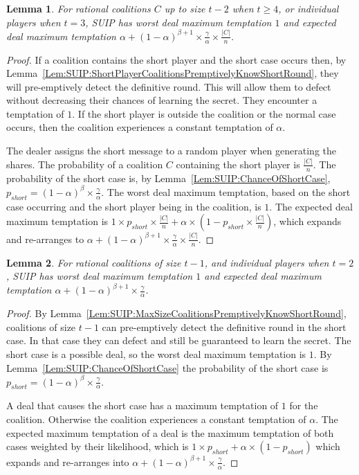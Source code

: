 \documentclass[12pt]{dalcsthesis}
\newtheorem{lemma}{Lemma}
\begin{document}
\begin{lemma}\label{Lem:SUIP:AllCoalitionsTempted}For rational coalitions $C$ up to size $t-2$ when $t \geq 4$, or individual players when $t=3$, SUIP has worst deal maximum temptation $1$ and expected deal maximum temptation $\alpha + (1-\alpha)^{\beta+1} \times \frac{\gamma}{\alpha} \times \frac{|C|}{n}$.\end{lemma}
\begin{proof}
If a coalition contains the short player and the short case occurs then, by Lemma~\ref{Lem:SUIP:ShortPlayerCoalitionsPremptivelyKnowShortRound}, they will pre-emptively detect the definitive round. This will allow them to defect without decreasing their chances of learning the secret. They encounter a temptation of $1$. If the short player is outside the coalition or the normal case occurs, then the coalition experiences a constant temptation of $\alpha$.

The dealer assigns the short message to a random player when generating the shares. The probability of a coalition $C$ containing the short player is $\frac{|C|}{n}$. The probability of the short case is, by Lemma~\ref{Lem:SUIP:ChanceOfShortCase}, $p_{short} = (1-\alpha)^\beta \times \frac{\gamma}{\alpha}$. The worst deal maximum temptation, based on the short case occurring and the short player being in the coalition, is $1$. The expected deal maximum temptation is $1 \times p_{short} \times \frac{|C|}{n} + \alpha \times (1 - p_{short} \times \frac{|C|}{n})$, which expands and re-arranges to $\alpha + (1-\alpha)^{\beta+1} \times \frac{\gamma}{\alpha} \times \frac{|C|}{n}$.
\end{proof}

\begin{lemma}\label{Lem:SUIP:MaxSizeCoalitionsTemptedMore}For rational coalitions of size $t-1$, and individual players when $t=2$, SUIP has worst deal maximum temptation $1$ and expected deal maximum temptation $\alpha + (1-\alpha)^{\beta+1} \times \frac{\gamma}{\alpha}$.\end{lemma}
\begin{proof}
By Lemma~\ref{Lem:SUIP:MaxSizeCoalitionsPremptivelyKnowShortRound}, coalitions of size $t-1$ can pre-emptively detect the definitive round in the short case. In that case they can defect and still be guaranteed to learn the secret. The short case is a possible deal, so the worst deal maximum temptation is $1$. By Lemma~\ref{Lem:SUIP:ChanceOfShortCase} the probability of the short case is $p_{short} = (1-\alpha)^\beta \times \frac{\gamma}{\alpha}$.

A deal that causes the short case has a maximum temptation of $1$ for the coalition. Otherwise the coalition experiences a constant temptation of $\alpha$. The expected maximum temptation of a deal is the maximum temptation of both cases weighted by their likelihood, which is $1 \times p_{short} + \alpha \times (1-p_{short})$ which expands and re-arranges into $\alpha + (1-\alpha)^{\beta+1} \times \frac{\gamma}{\alpha}$.
\end{proof}
\end{document}
